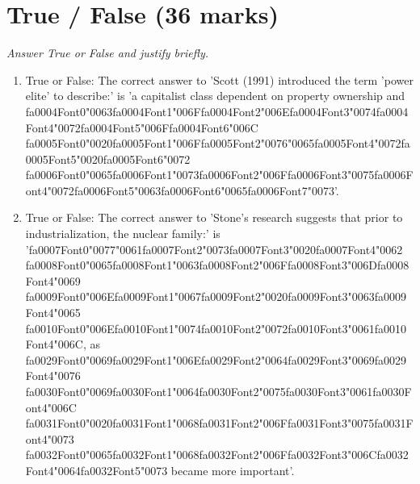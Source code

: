 \documentclass[12pt]{article}
\begin{document}
\section*{True / False (36 marks)}
\textit{Answer True or False and justify briefly.}
\begin{enumerate}[label=\arabic*.]
\item True or False: The correct answer to 'Scott (1991) introduced the term 'power elite' to describe:' is 'a capitalist class dependent on property ownership and {\csname fa0004Font0\endcsname\char"0063}{\csname fa0004Font1\endcsname\char"006F}{\csname fa0004Font2\endcsname\char"006E}{\csname fa0004Font3\endcsname\char"0074}{\csname fa0004Font4\endcsname\char"0072}{\csname fa0004Font5\endcsname\char"006F}{\csname fa0004Font6\endcsname\char"006C} {\csname fa0005Font0\endcsname\char"0020}{\csname fa0005Font1\endcsname\char"006F}{\csname fa0005Font2\endcsname\char"0076}{\char"0065}{\csname fa0005Font4\endcsname\char"0072}{\csname fa0005Font5\endcsname\char"0020}{\csname fa0005Font6\endcsname\char"0072} {\csname fa0006Font0\endcsname\char"0065}{\csname fa0006Font1\endcsname\char"0073}{\csname fa0006Font2\endcsname\char"006F}{\csname fa0006Font3\endcsname\char"0075}{\csname fa0006Font4\endcsname\char"0072}{\csname fa0006Font5\endcsname\char"0063}{\csname fa0006Font6\endcsname\char"0065}{\csname fa0006Font7\endcsname\char"0073}'.
\item True or False: The correct answer to 'Stone's research suggests that prior to industrialization, the nuclear family:' is '{\csname fa0007Font0\endcsname\char"0077}{\char"0061}{\csname fa0007Font2\endcsname\char"0073}{\csname fa0007Font3\endcsname\char"0020}{\csname fa0007Font4\endcsname\char"0062} {\csname fa0008Font0\endcsname\char"0065}{\csname fa0008Font1\endcsname\char"0063}{\csname fa0008Font2\endcsname\char"006F}{\csname fa0008Font3\endcsname\char"006D}{\csname fa0008Font4\endcsname\char"0069} {\csname fa0009Font0\endcsname\char"006E}{\csname fa0009Font1\endcsname\char"0067}{\csname fa0009Font2\endcsname\char"0020}{\csname fa0009Font3\endcsname\char"0063}{\csname fa0009Font4\endcsname\char"0065} {\csname fa0010Font0\endcsname\char"006E}{\csname fa0010Font1\endcsname\char"0074}{\csname fa0010Font2\endcsname\char"0072}{\csname fa0010Font3\endcsname\char"0061}{\csname fa0010Font4\endcsname\char"006C}, as {\csname fa0029Font0\endcsname\char"0069}{\csname fa0029Font1\endcsname\char"006E}{\csname fa0029Font2\endcsname\char"0064}{\csname fa0029Font3\endcsname\char"0069}{\csname fa0029Font4\endcsname\char"0076} {\csname fa0030Font0\endcsname\char"0069}{\csname fa0030Font1\endcsname\char"0064}{\csname fa0030Font2\endcsname\char"0075}{\csname fa0030Font3\endcsname\char"0061}{\csname fa0030Font4\endcsname\char"006C} {\csname fa0031Font0\endcsname\char"0020}{\csname fa0031Font1\endcsname\char"0068}{\csname fa0031Font2\endcsname\char"006F}{\csname fa0031Font3\endcsname\char"0075}{\csname fa0031Font4\endcsname\char"0073} {\csname fa0032Font0\endcsname\char"0065}{\csname fa0032Font1\endcsname\char"0068}{\csname fa0032Font2\endcsname\char"006F}{\csname fa0032Font3\endcsname\char"006C}{\csname fa0032Font4\endcsname\char"0064}{\csname fa0032Font5\endcsname\char"0073} became more important'.

\end{enumerate}
\end{document}
